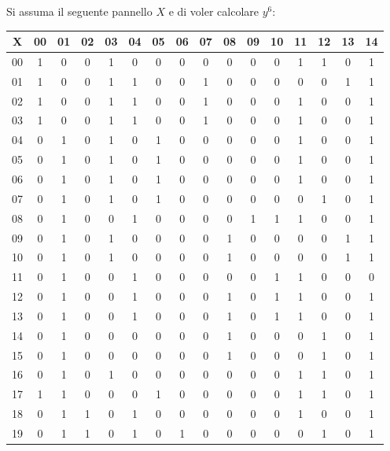 \begin{esempio}
  \label{es:pbwt1}
  Si assuma il seguente pannello $X$ e di voler calcolare $y^6$:
  \begin{table}[H]
    \centering
    \small
    \begin{tabular}{c|ccccccccccccccc}
      X & 00 & 01 & 02 & 03 & 04 & 05 & 06 & 07 & 08 & 09 & 10 & 11 & 12 & 13
      & 14 \\
      \hline
      00 & 1 & 0 & 0 & 1 & 0 & 0 & 0 & 0 & 0 & 0 & 0 & 1 & 1 & 0 & 1 \\
      01 & 1 & 0 & 0 & 1 & 1 & 0 & 0 & 1 & 0 & 0 & 0 & 0 & 0 & 1 & 1 \\
      02 & 1 & 0 & 0 & 1 & 1 & 0 & 0 & 1 & 0 & 0 & 0 & 1 & 0 & 0 & 1 \\
      03 & 1 & 0 & 0 & 1 & 1 & 0 & 0 & 1 & 0 & 0 & 0 & 1 & 0 & 0 & 1 \\
      04 & 0 & 1 & 0 & 1 & 0 & 1 & 0 & 0 & 0 & 0 & 0 & 1 & 0 & 0 & 1 \\
      05 & 0 & 1 & 0 & 1 & 0 & 1 & 0 & 0 & 0 & 0 & 0 & 1 & 0 & 0 & 1 \\
      06 & 0 & 1 & 0 & 1 & 0 & 1 & 0 & 0 & 0 & 0 & 0 & 1 & 0 & 0 & 1 \\
      07 & 0 & 1 & 0 & 1 & 0 & 1 & 0 & 0 & 0 & 0 & 0 & 0 & 1 & 0 & 1 \\
      08 & 0 & 1 & 0 & 0 & 1 & 0 & 0 & 0 & 0 & 1 & 1 & 1 & 0 & 0 & 1 \\
      09 & 0 & 1 & 0 & 1 & 0 & 0 & 0 & 0 & 1 & 0 & 0 & 0 & 0 & 1 & 1 \\
      10 & 0 & 1 & 0 & 1 & 0 & 0 & 0 & 0 & 1 & 0 & 0 & 0 & 0 & 1 & 1 \\
      11 & 0 & 1 & 0 & 0 & 1 & 0 & 0 & 0 & 0 & 0 & 1 & 1 & 0 & 0 & 0 \\
      12 & 0 & 1 & 0 & 0 & 1 & 0 & 0 & 0 & 1 & 0 & 1 & 1 & 0 & 0 & 1 \\
      13 & 0 & 1 & 0 & 0 & 1 & 0 & 0 & 0 & 1 & 0 & 1 & 1 & 0 & 0 & 1 \\
      14 & 0 & 1 & 0 & 0 & 0 & 0 & 0 & 0 & 1 & 0 & 0 & 0 & 1 & 0 & 1 \\
      15 & 0 & 1 & 0 & 0 & 0 & 0 & 0 & 0 & 1 & 0 & 0 & 0 & 1 & 0 & 1 \\
      16 & 0 & 1 & 0 & 1 & 0 & 0 & 0 & 0 & 0 & 0 & 0 & 1 & 1 & 0 & 1 \\
      17 & 1 & 1 & 0 & 0 & 0 & 1 & 0 & 0 & 0 & 0 & 0 & 1 & 1 & 0 & 1 \\
      18 & 0 & 1 & 1 & 0 & 1 & 0 & 0 & 0 & 0 & 0 & 0 & 1 & 0 & 0 & 1 \\
      19 & 0 & 1 & 1 & 0 & 1 & 0 & 1 & 0 & 0 & 0 & 0 & 0 & 1 & 0 & 1 

\end{tabular}
\end{table}
\end{esempio}
